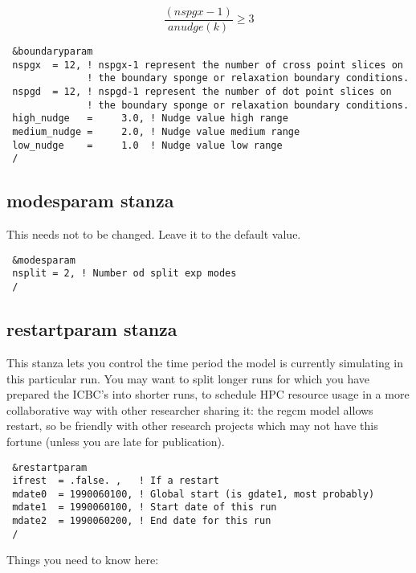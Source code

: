 \begin{equation}
\frac{(nspgx-1)}{anudge(k)} \ge 3
\end{equation}

{\footnotesize
\begin{Verbatim}
 &boundaryparam
 nspgx  = 12, ! nspgx-1 represent the number of cross point slices on
              ! the boundary sponge or relaxation boundary conditions.
 nspgd  = 12, ! nspgd-1 represent the number of dot point slices on
              ! the boundary sponge or relaxation boundary conditions.
 high_nudge   =     3.0, ! Nudge value high range
 medium_nudge =     2.0, ! Nudge value medium range
 low_nudge    =     1.0  ! Nudge value low range
 /
\end{Verbatim}
}

\subsection{modesparam stanza}

This needs not to be changed. Leave it to the default value.

{\footnotesize
\begin{Verbatim}
 &modesparam
 nsplit = 2, ! Number od split exp modes
 /
\end{Verbatim}
}

\subsection{restartparam stanza}

This stanza lets you control the time period the model is currently simulating
in this particular run. You may want to split longer runs for which you have
prepared the ICBC's into shorter runs, to schedule HPC resource usage in a more
collaborative way with other researcher sharing it: the regcm model allows
restart, so be friendly with other research projects which may not have this
fortune (unless you are late for publication).

{\footnotesize
\begin{Verbatim}
 &restartparam
 ifrest  = .false. ,   ! If a restart
 mdate0  = 1990060100, ! Global start (is gdate1, most probably)
 mdate1  = 1990060100, ! Start date of this run
 mdate2  = 1990060200, ! End date for this run
 /
\end{Verbatim}
}

Things you need to know here:

